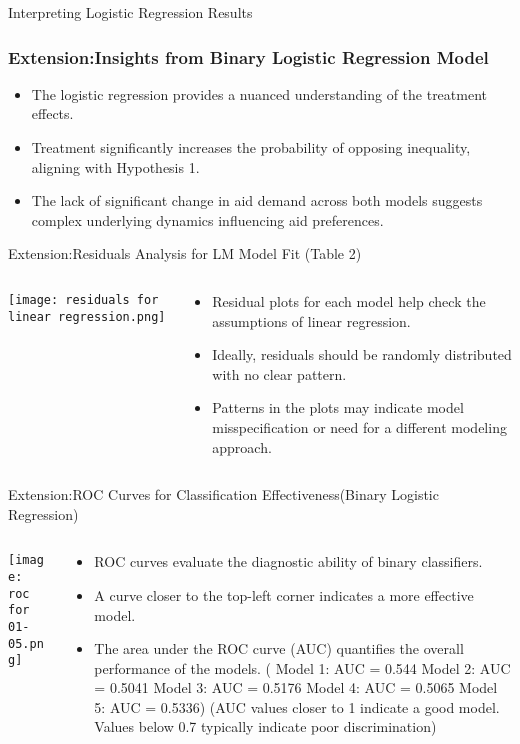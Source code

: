 \documentclass[aspectratio=169,10pt,compress]{beamer}
\begin{document}
\begin{frame}{Interpreting Logistic Regression Results}
  \frametitle{Extension:Insights from Binary Logistic Regression Model}
  
  \begin{itemize}
    \item The logistic regression provides a nuanced understanding of the treatment effects.
    \item Treatment significantly increases the probability of opposing inequality, aligning with Hypothesis 1.
    \item The lack of significant change in aid demand across both models suggests complex underlying dynamics influencing aid preferences.
  \end{itemize}
\end{frame}
\begin{frame}{Extension:Residuals Analysis for LM Model Fit (Table 2)}
  \begin{columns}
    \begin{column}{0.6\textwidth}
      \texttt{[image: residuals for linear regression.png]}
    \end{column}
    \begin{column}{0.4\textwidth}
      \begin{itemize}
        \item Residual plots for each model help check the assumptions of linear regression.
        \item Ideally, residuals should be randomly distributed with no clear pattern.
        \item Patterns in the plots may indicate model misspecification or need for a different modeling approach.
      \end{itemize}
    \end{column}
  \end{columns}
\end{frame}
\begin{frame}{Extension:ROC Curves for Classification Effectiveness(Binary Logistic Regression)}
  \begin{columns}
    \begin{column}{0.6\textwidth}
      \texttt{[image: roc for 01-05.png]}
    \end{column}
    \begin{column}{0.4\textwidth}
      \begin{itemize}
        \item ROC curves evaluate the diagnostic ability of binary classifiers.
        \item A curve closer to the top-left corner indicates a more effective model.
        \item The area under the ROC curve (AUC) quantifies the overall performance of the models.
       ( Model 1: AUC = 0.544
        Model 2: AUC = 0.5041
        Model 3: AUC = 0.5176
        Model 4: AUC = 0.5065
        Model 5: AUC = 0.5336)
        (AUC values closer to 1 indicate a good model. Values below 0.7 typically indicate poor discrimination)
      \end{itemize}
    \end{column}
  \end{columns}
\end{frame}
\end{document}

